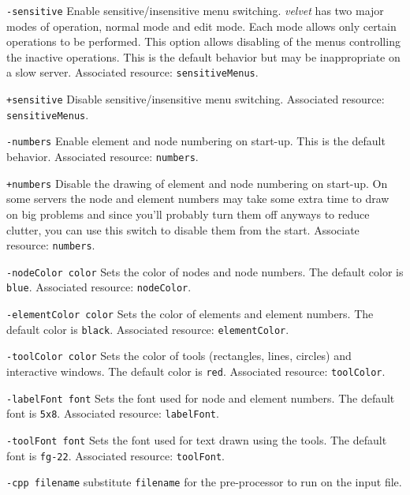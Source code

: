 \begin{dispitems}
\item[\tt -sensitive]
Enable sensitive/insensitive menu switching.  {\em velvet} has two major
modes of operation, normal mode and edit mode.  Each mode allows only certain
operations to be performed.  This option allows disabling of the menus
controlling the inactive operations.  This is the default behavior but
may be inappropriate on a slow server.  Associated resource: 
{\tt *sensitiveMenus}.

\item[\tt +sensitive]
Disable sensitive/insensitive menu switching.  Associated resource:
{\tt *sensitiveMenus}.

\item[\tt -numbers]
Enable element and node numbering on start-up.  This is the default
behavior. Associated resource: {\tt *numbers}.

\item[\tt +numbers]
Disable the drawing of element and node numbering on start-up.   On some
servers the node and element numbers may take some extra time to
draw on big problems and since you'll probably turn them off anyways to
reduce clutter, you can use this switch to disable them from the start.
Associate resource: {\tt *numbers}.

\item[\tt -nodeColor color]
Sets the color of nodes and node numbers.  The default color is {\tt blue}.
Associated resource: {\tt *nodeColor}.

\item[\tt -elementColor color]
Sets the color of elements and element numbers.  The default color is 
{\tt black}.  Associated resource: {\tt *elementColor}.  

\item[\tt -toolColor color]
Sets the color of tools (rectangles, lines, circles) and interactive windows.
The default color is {\tt red}.  Associated resource: {\tt *toolColor}.

\item[\tt -labelFont font]
Sets the font used for node and element numbers.  The default font is 
{\tt 5x8}.  Associated resource: {\tt *labelFont}.

\item[\tt -toolFont font]
Sets the font used for text drawn using the tools.  The default font is
{\tt fg-22}.  Associated resource: {\tt *toolFont}.

\item [\tt -cpp filename]
	substitute {\tt filename} for the pre-processor to run on the 
	input file.


\end{dispitems}
